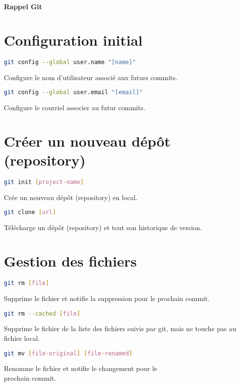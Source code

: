 \documentclass[10pt,landscape]{article}
\begin{document}
\raggedright
\footnotesize
\begin{multicols*}{3}


\setlength{\premulticols}{1pt}
\setlength{\postmulticols}{1pt}
\setlength{\multicolsep}{1pt}
\setlength{\columnsep}{2pt}

\begin{center}
     \Large{\textbf{Rappel Git}} \\
\end{center}

\section{Configuration initial}
\begin{lstlisting}[language=bash]
git config --global user.name "[name]"
\end{lstlisting}
Configure le nom d’utilisateur associé aux futurs commits.
\begin{lstlisting}[language=bash]
git config --global user.email "[email]"
\end{lstlisting}
Configure le courriel associer au futur commits.


\section{Créer un nouveau dépôt (repository)}
\begin{lstlisting}[language=bash]
git init [project-name]
\end{lstlisting}
Crée un nouveau dépôt (repository) en local.\\
\begin{lstlisting}[language=bash]
git clone [url]
\end{lstlisting}
Télécharge un dépôt (repository) et tout son historique de version.


\section{Gestion des fichiers}
\begin{lstlisting}[language=bash]
git rm [file]
\end{lstlisting}
Supprime le fichier et notifie la suppression pour le prochain commit.\\
\begin{lstlisting}[language=bash]
git rm --cached [file]
\end{lstlisting}
Supprime le fichier de la liste des fichiers suivis par git, mais ne touche pas au fichier local.\\
\begin{lstlisting}[language=bash]
git mv [file-original] [file-renamed]
\end{lstlisting}
Renomme le fichier et notifie le changement pour le\\
prochain commit.


\end{multicols*}
\end{document}
